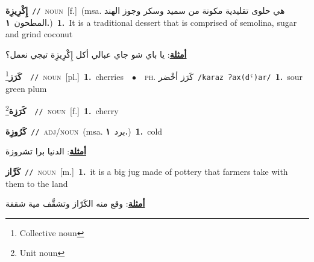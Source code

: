 \documentclass[10pt,a4paper,twoside]{article} %
\begin{document}
\begin{multicols}{2}
{\setlength\topsep{0pt}\textbf{\foreignlanguage{arabic}{إِكْرِيزِة}}\ {\color{gray}\texttt{//}\color{black}}\ \textsc{noun}\ [f.]\ \color{gray}(msa. \foreignlanguage{arabic}{هي حلوى تقليدية مكونة من سميد وسكر وجوز الهند المطحون}~\foreignlanguage{arabic}{\textbf{١.}})\color{black}\ \textbf{1.}~It is a traditional dessert that is comprised of semolina, sugar and grind coconut\  \begin{flushright}\color{gray}\foreignlanguage{arabic}{\textbf{\underline{\foreignlanguage{arabic}{أمثلة}}}: يا باي شو جاي عبالي أكل إِكْرِيزِة تيجي نعمل؟}\end{flushright}\color{black}} \vspace{2mm}

{\setlength\topsep{0pt}\textbf{\foreignlanguage{arabic}{كَرَز}}\footnote{Collective noun}\ \ {\color{gray}\texttt{//}\color{black}}\ \textsc{noun}\ [pl.]\ \textbf{1.}~cherries\ \ $\bullet$\ \ \textsc{ph.} \color{gray} \foreignlanguage{arabic}{كَرَز أخْضر}\color{black}\ {\color{gray}\texttt{/{\sffamily karaz ʔax(dˤ)ar}/}\color{black}}\ \textbf{1.}~sour green plum\ } \vspace{2mm}

{\setlength\topsep{0pt}\textbf{\foreignlanguage{arabic}{كَرَزِة}}\footnote{Unit noun}\ \ {\color{gray}\texttt{//}\color{black}}\ \textsc{noun}\ [f.]\ \textbf{1.}~cherry\ } \vspace{2mm}

{\setlength\topsep{0pt}\textbf{\foreignlanguage{arabic}{كَرُوزِة}}\ {\color{gray}\texttt{//}\color{black}}\ \textsc{adj/noun}\ \color{gray}(msa. \foreignlanguage{arabic}{برد}~\foreignlanguage{arabic}{\textbf{١.}})\color{black}\ \textbf{1.}~cold\  \begin{flushright}\color{gray}\foreignlanguage{arabic}{\textbf{\underline{\foreignlanguage{arabic}{أمثلة}}}: الدنيا برا تشروزة}\end{flushright}\color{black}} \vspace{2mm}

{\setlength\topsep{0pt}\textbf{\foreignlanguage{arabic}{كَرَّاز}}\ {\color{gray}\texttt{//}\color{black}}\ \textsc{noun}\ [m.]\ \textbf{1.}~it is a big jug made of pottery that farmers take with them to the land\  \begin{flushright}\color{gray}\foreignlanguage{arabic}{\textbf{\underline{\foreignlanguage{arabic}{أمثلة}}}: وقع منه الكَرّاز وتشقَّف مية شقفة}\end{flushright}\color{black}} \vspace{2mm}


\end{multicols}
\end{document}
